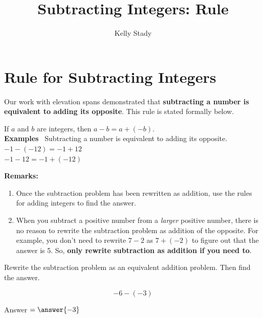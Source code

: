 \documentclass{ximera}[font=12pt]
\title{Subtracting Integers: Rule}   %
\author{Kelly Stady}
\begin{document}
\begin{abstract}

\end{abstract}

\maketitle
\label{xim:SubtractIntIntroActivity}

\section*{Rule for Subtracting Integers}

Our work with elevation spans demonstrated that \textbf{subtracting a number is equivalent to adding its opposite}. This rule is stated formally below.

\begin{procedure}


If $a$ and $b$ are integers, then $a-b = a + (-b).$  \\


\textbf{Examples} \ Subtracting a number is equivalent to adding its opposite. \\ 


$-1 - (-12) = -1 + 12$ \\

$-1 - 12 = -1 + (-12)$


\end{procedure}

\textbf{Remarks:}

\begin{enumerate}

\item Once the subtraction problem has been rewritten as addition, use the rules for adding integers to find the answer.

\item When you subtract a positive number from a \emph{larger} positive number, there is no reason to rewrite the subtraction problem as
addition of the opposite.  For example, you don't need to rewrite $7-2$ as $7 + (-2)$ to figure out that the answer is 5.  So, \textbf{only rewrite subtraction as addition
if you need to}.
\end{enumerate}


\begin{problem}
Rewrite the subtraction problem as an equivalent addition problem.  Then find the answer.

\[ -6 - (-3) \]

\begin{multipleChoice}
\end{multipleChoice}

\begin{problem}
Answer  $ = \answer{-3}$

\end{problem}
\end{problem}
\end{document}
